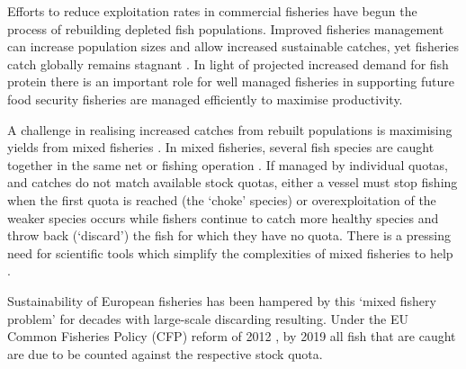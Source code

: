 \documentclass{nature}
\begin{document}
\begin{linenumbers}
 Efforts to reduce exploitation rates in commercial fisheries
have begun the process of rebuilding depleted fish populations\cite{Worm2009}.
Improved fisheries management  can increase
population sizes and allow increased sustainable catches, yet fisheries catch
globally remains stagnant . In light of projected
increased demand for fish protein  there is an
important role for well managed fisheries in supporting future food security
\cite{Mcclanahan2015}  
 fisheries
are managed efficiently to maximise productivity.

A  challenge in realising increased catches
from rebuilt populations is maximising yields from mixed fisheries
\cite{Branch2008, Kuriyama2016, Ulrich2016}. In mixed fisheries,  several fish species are caught
together in the same net or fishing operation . If managed by individual quotas, and catches do not
match available stock quotas, either a vessel must stop fishing when the first
quota is reached (the `choke' species) or overexploitation of the weaker
species occurs while fishers continue to catch more healthy species and throw
back (`discard') the fish for which they have no quota\cite{Batsleer2015}.
There is a pressing need for scientific tools which
simplify the complexities of mixed fisheries to help . 

Sustainability of European fisheries has been hampered by this `mixed fishery
problem' for decades with large-scale discarding resulting\cite{Uhlmann2014}.
 Under the EU Common Fisheries
Policy (CFP) reform of 2012 , by 2019 all fish that are caught are due to be
counted against the respective stock quota. 


\end{linenumbers}
\end{document}
